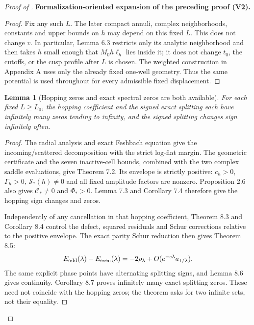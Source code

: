 \documentclass[11pt]{article}
\newtheorem{lemma}[theorem]{Lemma}
\newcommand{\formalisationparentid}{X}
\newenvironment{formalisationaddition}[1]{\par\medskip\begingroup\color{blue}\def\formalisationparentid{#1}\setcounter{formalizationsublemma}{0}\let\lemma\formalizationsublemma\let\endlemma\endformalizationsublemma
  \def\Eo{\mathcal E_h^\circ}\def\EE{\mathcal E_h}\def\phio{\phi_h^\circ}\def\phih{\phi_h}\def\Ho{H_h^{\rm atom}(v^\circ)}\def\Ha{H_h^{\rm atom}}\def\HL{H_h^{L}}\def\Dh{D_h}\def\Log{\operatorname{Log}}\def\ellh{\ell_h}\def\Gp{G_{p,h}}\def\Ast{A_{*,h}}\def\ahat{\widehat{\mathfrak a}_h}\def\ah{\mathfrak a_h}\def\rh{\widehat\rho_h}\def\deltah{\widehat\delta_h}\def\oldref##1{\textup{(##1)}}\def\interface##1{\par\noindent\textit{Analytical interface used here.} ##1\par}\def\finish{\par\noindent\textit{Conclusion of the formalization-oriented expansion.} }\par\noindent\textbf{Formalization-oriented expansion of the preceding proof (V2).}\par\smallskip
}{\par\endgroup\medskip
}
\begin{document}
\begin{proof}[Proof of ]
\begin{formalisationaddition}{T1.1}
\begin{proof}
Fix any such $L$. The later compact annuli, complex neighborhoods, constants and upper bounds on $h$ may depend on this fixed $L$. This does not change $v$. In particular, Lemma 6.3 restricts only its analytic neighborhood and then takes $h$ small enough that $M_0h\ellh$ lies inside it; it does not change $t_0$, the cutoffs, or the cusp profile after $L$ is chosen. The weighted construction in Appendix A uses only the already fixed one-well geometry. Thus the same potential is used throughout for every admissible fixed displacement.
\end{proof}

\begin{lemma}[Hopping zeros and exact spectral zeros are both available]\label{sublemma:T1-1-two-zero-statements}
For each fixed $L\ge L_0$, the hopping coefficient and the signed exact splitting each have infinitely many zeros tending to infinity, and the signed splitting changes sign infinitely often.
\end{lemma}
\begin{proof}
The radial analysis and exact Feshbach equation give the incoming/scattered decomposition with the strict log-flat margin. The geometric certificate and the seven inactive-cell bounds, combined with the two complex saddle evaluations, give Theorem 7.2. Its envelope is strictly positive: $c_h>0$, $\Gamma_h>0$, $\mathcal S_*(h)\ne0$ and all fixed amplitude factors are nonzero. Proposition 2.6 also gives $\mathscr C_*\ne0$ and $\Phi_*>0$. Lemma 7.3 and Corollary 7.4 therefore give the hopping sign changes and zeros.

Independently of any cancellation in that hopping coefficient, Theorem 8.3 and Corollary 8.4 control the defect, squared residuals and Schur corrections relative to the positive envelope. The exact parity Schur reduction then gives Theorem 8.5:
\[
 E_{\rm odd}(\lambda)-E_{\rm even}(\lambda)
 =-2\rho_\lambda+O(e^{-c\lambda}a_{1/\lambda}).
\]
The same explicit phase points have alternating splitting signs, and Lemma 8.6 gives continuity. Corollary 8.7 proves infinitely many exact splitting zeros. These need not coincide with the hopping zeros; the theorem asks for two infinite sets, not their equality.
\end{proof}


\end{formalisationaddition}
\end{proof}
\end{document}
